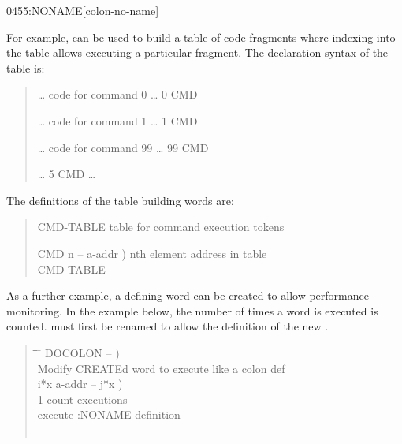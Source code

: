 \begin{worddef}{0455}{:NONAME}[colon-no-name]
\begin{defer}
		For example,  can be used to build a table of
		code fragments where indexing into the table allows executing
		a particular fragment. The declaration syntax of the table is:

		\begin{quote}\ttfamily
			 {\ldots} code for command 0 {\ldots} \word{;}
			0 CMD \word{!}

			 {\ldots} code for command 1 {\ldots} \word{;}
			1 CMD \word{!}

			\tab {\ldots}

			 {\ldots} code for command 99 {\ldots} \word{;}
			99 CMD \word{!}

			{\ldots} 5 CMD   {\ldots}
		\end{quote}

		The definitions of the table building words are:

		\begin{quote}\ttfamily
			 CMD-TABLE
				 table for command execution tokens \\
			  

			\word{:} CMD  n -- a-addr )
				 nth element address in table \\
			\tab {} CMD-TABLE \word{+}
			\word{;}
		\end{quote}

		As a further example, a defining word can be created to allow
		performance monitoring. In the example below, the number of
		times a word is executed is counted. \word{:} must first be
		renamed to allow the definition of the new \word{;}.

		\begin{quote}\ttfamily
		  \begin{tabbing}
			\tab \= \tab \= \hspace*{12em} \= \kill
			\word{:} DOCOLON  -- ) \\
			\+  Modify CREATEd word to execute like a colon def \\
				\+   i*x a-addr -- j*x ) \\
					1  \word{+!}								\>  count executions \\
			\-	\-	  				\>  execute :NONAME definition \\
			\word{;} \\[1.5\parskip]


\end{tabbing}
\end{quote}
\end{defer}
\end{worddef}
